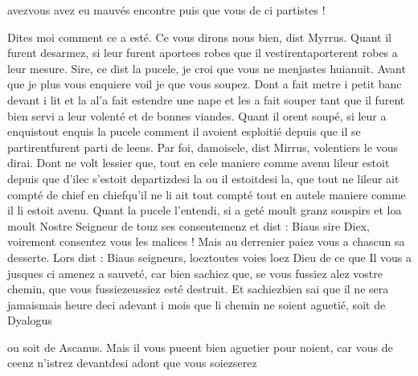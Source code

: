 \documentclass{article}
\begin{document}
\begin{pages}
                     avezvous avez eu mauvés encontre puis que vous de ci partistes !

                     Dites moi comment ce a esté.
               Ce vous dirons nous bien, dist Myrrus. Quant il furent desarmez, si leur 
                  furent aportees robes que il vestirentaporterent robes a leur mesure. Sire, 
                     ce dist la pucele, je croi que vous ne menjastes 
                     huianuit. Avant que je plus vous enquiere voil je que vous soupez. Dont a
               fait metre i petit banc 
                  devant
               i lit et 
                  la al'a fait estendre une nape et les a fait souper tant que il furent 
                  bien servi a leur volenté et de bonnes viandes. Quant il orent soupé,
               si leur a 
                  enquistout enquis
               la pucele
               comment il avoient esploitié depuis que il se 
                     partirentfurent parti de leens. Par foi, damoisele, dist
                     Mirrus, volentiers le vous dirai. \pend
            \pstart Dont ne volt lessier 
                  que, tout en cele maniere comme avenu 
                        lileur estoit depuis que 
                        d’ilec s’estoit departizdesi la ou il estoitdesi la, que tout ne 
                        lileur ait compté de chief en chiefqu'il ne li ait tout compté tout en autele maniere comme il li
                     estoit avenu. Quant la pucele l’entendi, si a geté
               moult granz souspirs et loa moult Nostre Seigneur de touz ses consentemenz et dist :
                  Biaus sire Diex, voirement consentez vous les
                  malices ! Mais au derrenier paiez vous a chascun sa desserte. Lors dist :
                  Biaus seigneurs, 
                     loeztoutes voies loez Dieu de ce que Il vous a 
                     jusques ci amenez a sauveté, car bien sachiez que, se vous fussiez alez vostre
                  chemin, 
                     que vous 
                     fussiezeussiez esté destruit. Et 
                     sachiezbien sai que il ne sera 
                     jamaismais heure 
                     deci adevant
                  i mois que li chemin ne soient aguetié, soit de Dyalogus
                  
                     ou soit de Ascanus. Mais il vous pueent
                  bien aguetier pour noient, car vous de ceenz n’istrez 
                     devantdesi adont que vous 
                     soiezserez
                  

\end{pages}
\end{document}
